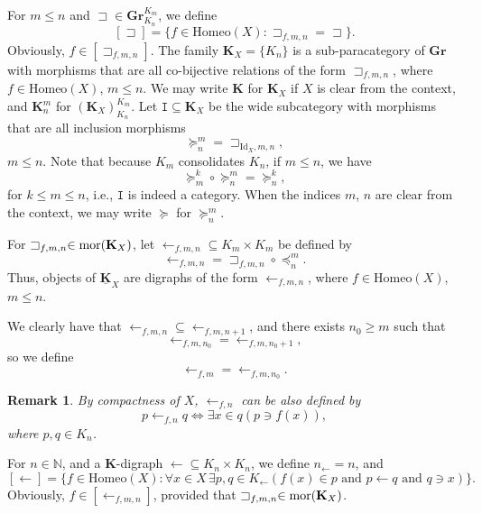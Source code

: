 \documentclass[12pt]{amsart}
\numberwithin{equation}{section}
\theoremstyle{plain}
\newtheorem{remark}[theorem]{\bf Remark}
\theoremstyle{definition}
\newcommand \Homeo{ \mbox{Homeo}}
\newcommand \Id{ \mbox{Id}}
\newcommand \sqsp{\sqsupset}
\newcommand \sqsb{\sqsubset}
\newcommand \la{\leftarrow}
\newcommand \mor{{\rm{mor}}}
\newcommand \GGRb{\mathbf{Gr}}
\newcommand \KKb{\mathbf{K}}
\newcommand \GGRub{\underline{\mathbf{Gr}}}
\newcommand \KKub{\underline{\mathbf{K}}}
\newcommand \NN{\mathbb{N}}
\newcommand \It{\mathtt{I}}
\begin{document}
For $m \leq n$ and $\sqsp \in \GGRb^{K_m}_{K_n}$, we define
%
\[ [\sqsp]=\{f \in \Homeo(X):  \sqsp_{f,m,n}=\sqsp \}. \]
%
Obviously, $f \in [ \sqsp_{f,m,n}]$. The family $\KKb_X=\{K_n\}$ is a sub-paracategory of $\GGRb$ with morphisms that are all co-bijective relations of the form $\sqsp_{f,m,n}$, where $f \in \Homeo(X)$, $m \leq n$.
%
We may write $\KKb$ for $\KKb_X$ if $X$ is clear from the context, and $\KKb^m_n$ for $(\KKb_X)^{K_m}_{K_n}$. Let $\mathtt{I} \subseteq \KKb_X$ be the wide subcategory with morphisms that are all inclusion morphisms $$\succeq^m_n=\sqsp_{\Id_X,m,n},$$  $m \leq n$. Note that because $K_m$ consolidates $K_n$, if $m \leq n$, we have $$\succeq^k_m \circ \succeq^m_n = \succeq^k_n,$$ for $k \leq m \leq n$, i.e., $\It$ is indeed a category.  When the indices $m$, $n$ are clear from the context, we may write $\succeq$ for $\succeq^m_n$. 

%

%
%
%

For $\sqsp_{f,m,n} \in \mor(\KKb_X)$, let $\la_{f,m,n} \subseteq K_m \times K_m$ be defined by $$\la_{f,m,n}=\sqsp_{f,m,n} \circ \preceq^m_n.$$ 
%
Thus, objects of $\KKub_X$ are digraphs of the form $\la_{f,m,n}$, where $f \in \Homeo(X)$, $m \leq n$. 

We clearly have that $\la_{f,m,n} \subseteq \la_{f,m,n+1}$, and there exists $n_0 \geq m$ such that $$\la_{f,m,n_0}=\la_{f,m,n_0+1},$$  so we define $$\la_{f,m}=\la_{f,m,n_0}.$$ 
\begin{remark}
By compactness of $X$, $\la_{f,n}$ can be also defined by
%
$$ p \la_{f,n} q \iff \exists x \in q (p \ni f(x)),$$
%
where  $p, q \in K_n$.
\end{remark}

For $n \in \NN$, and  a $\KKb$-digraph $\la \subseteq K_n \times K_n$, we define $n_\la=n$, and
%	
\[ [\la]=\{ f \in \Homeo(X): \forall x \in X \, \exists p,q \in K_\la (f(x) \in p \mbox{ and } p \la q \mbox{ and } q \ni x )  \}. \]
%
Obviously, $f \in [\la_{f,m,n}]$, provided that $\sqsp_{f,m,n} \in \mor(\KKb_X)$.  
\end{document}
